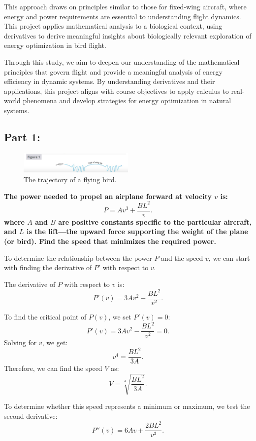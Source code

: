 \documentclass{article}
\begin{document}
This approach draws on principles similar to those for fixed-wing aircraft, where energy and power requirements are essential to understanding flight dynamics. This project applies mathematical analysis to a biological context, using derivatives to derive meaningful insights about biologically relevant exploration of energy optimization in bird flight.

Through this study, we aim to deepen our understanding of the mathematical principles that govern flight and provide a meaningful analysis of energy efficiency in dynamic systems. By understanding derivatives and their applications, this project aligns with course objectives to apply calculus to real-world phenomena and develop strategies for energy optimization in natural systems.
\newpage


\subsection*{Part 1:}
\begin{figure}[h]
    \centering
    \includegraphics[width=0.5\textwidth]{bird.png}
    \caption{\small The trajectory of a flying bird.}
    \label{fig:bird}
\end{figure}

{\large \bfseries The power needed to propel an airplane forward at velocity \( v \) is: 
}\[
P = Av^3 + \frac{BL^2}{v}.
\]
{\large \bfseries where \( A \) and \( B \) are positive constants specific to the particular aircraft, and \( L \) is the lift—the upward force supporting the weight of the plane (or bird). Find the speed that minimizes the required power.}
\setlength{\parskip}{2em}

To determine the relationship between the power \(P\) and the speed \(v\), we can start with finding the derivative of \(P'\) with respect to \(v\).

The derivative of \( P \) with respect to \( v \) is:
\[
P'(v) = 3Av^2 - \frac{BL^2}{v^2}.
\]

To find the critical point of \( P(v) \), we set \( P'(v) = 0 \):
\[
P'(v) = 3Av^2 - \frac{BL^2}{v^2} = 0.
\]
Solving for \( v \), we get:
\[
v^4 = \frac{BL^2}{3A}.
\]
Therefore, we can find the speed \( V \) as:
\[
V = \sqrt[4]{\frac{BL^2}{3A}}.
\]

To determine whether this speed represents a minimum or maximum, we test the second derivative:
\[
P''(v) = 6Av + \frac{2BL^2}{v^3}.
\]
\end{document}

